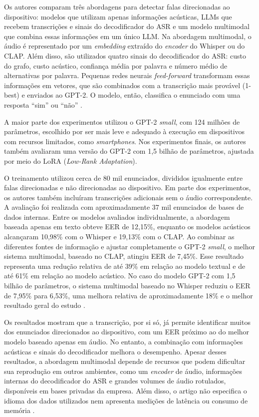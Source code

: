 \documentclass[
    12pt,                %
    openright,           %
    oneside,             %
    a4paper,             %
    english,             %
    brazil               %
]{abntex2}
\begin{document}
Os autores comparam três abordagens para detectar falas direcionadas ao dispositivo: modelos que utilizam apenas informações acústicas, LLMs que recebem transcrições e sinais do decodificador do ASR e um modelo multimodal que combina essas informações em um único LLM. Na abordagem multimodal, o áudio é representado por um \textit{embedding} extraído do \textit{encoder} do Whisper ou do CLAP. Além disso, são utilizados quatro sinais do decodificador do ASR: custo do grafo, custo acústico, confiança média por palavra e número médio de alternativas por palavra. Pequenas redes neurais \textit{feed-forward} transformam essas informações em vetores, que são combinados com a transcrição mais provável (1-best) e enviados ao GPT-2. O modelo, então, classifica o enunciado com uma resposta ``sim'' ou ``não'' \cite{Wagner2024}.

A maior parte dos experimentos utilizou o GPT-2 \textit{small}, com 124 milhões de parâmetros, escolhido por ser mais leve e adequado à execução em dispositivos com recursos limitados, como \textit{smartphones}. Nos experimentos finais, os autores também avaliaram uma versão do GPT-2 com 1,5 bilhão de parâmetros, ajustada por meio do LoRA (\textit{Low-Rank Adaptation}).

O treinamento utilizou cerca de 80 mil enunciados, divididos igualmente entre falas direcionadas e não direcionadas ao dispositivo. Em parte dos experimentos, os autores também incluíram transcrições adicionais sem o áudio correspondente. A avaliação foi realizada com aproximadamente 37 mil enunciados de bases de dados internas. Entre os modelos avaliados individualmente, a abordagem baseada apenas em texto obteve EER de 12,15\%, enquanto os modelos acústicos alcançaram 10,98\% com o Whisper e 19,13\% com o CLAP. Ao combinar as diferentes fontes de informação e ajustar completamente o GPT-2 \textit{small}, o melhor sistema multimodal, baseado no CLAP, atingiu EER de 7,45\%. Esse resultado representa uma redução relativa de até 39\% em relação ao modelo textual e de até 61\% em relação ao modelo acústico. No caso do modelo GPT-2 com 1,5 bilhão de parâmetros, o sistema multimodal baseado no Whisper reduziu o EER de 7,95\% para 6,53\%, uma melhora relativa de aproximadamente 18\% e o melhor resultado geral do estudo \cite{Wagner2024}.

Os resultados mostram que a transcrição, por si só, já permite identificar muitos dos enunciados direcionados ao dispositivo, com um EER próximo ao do melhor modelo baseado apenas em áudio. No entanto, a combinação com informações acústicas e sinais do decodificador melhora o desempenho. Apesar desses resultados, a abordagem multimodal depende de recursos que podem dificultar sua reprodução em outros ambientes, como um \textit{encoder} de áudio, informações internas do decodificador do ASR e grandes volumes de áudio rotulados, disponíveis em bases privadas da empresa. Além disso, o artigo não especifica o idioma dos dados utilizados nem apresenta medições de latência ou consumo de memória \cite{Wagner2024}.
\end{document}

